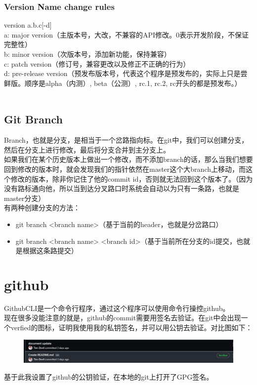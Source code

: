 \documentclass{article}
\begin{document}
\subsubsection{Version Name change rules}
version a.b.c[-d]\\
a: major version（主版本号，大改，不兼容的API修改。0表示开发阶段，不保证完整性）\\
b: minor version（次版本号，添加新功能，保持兼容）\\
c: patch version（修订号，兼容更改以及修正不正确的行为）\\
d: pre-release version（预发布版本号，代表这个程序是预发布的，实际上只是尝鲜版。顺序是alpha（内测）, beta（公测）, rc.1, rc.2, rc开头的都是预发布。）\\
\\
\subsection{Git Branch}
Branch，也就是分支，是相当于一个岔路指向标。在git中，我们可以创建分支，然后在分支上进行修改，最后将分支合并到主分支上。\\
如果我们在某个历史版本上做出一个修改，而不添加branch的话，那么当我们想要回到修改的版本时，就会发现我们的指针依然在master这个大branch上移动，而这个修改的版本，除非你记住了他的commit id，否则就无法回到这个版本了。（因为没有路标通向他，所以当到达分叉路口时系统会自动以为只有一条路，也就是master分支）\\
有两种创建分支的方法：\\
\begin{itemize}
    \item git branch <branch name>（基于当前的header，也就是分岔路口）
    \item git branch <branch name> <branch id>（基于当前所在分支的id提交，也就是根据这条路提交）
\end{itemize}
\section{github}
\noindent
GithubCLI是一个命令行程序，通过这个程序可以使用命令行操控github。\\
现在很多没能注意的就是，github的commit需要用签名去验证。在git中会出现一个verfied的图标，证明我使用我的私钥签名，并可以用公钥去验证。对比图如下：\\
\begin{figure}[h]
    \centering
    \includegraphics[width=\textwidth]{pic1_verfied.png}\\
\end{figure}
基于此我设置了github的公钥验证，在本地的git上打开了GPG签名。
\end{document}
